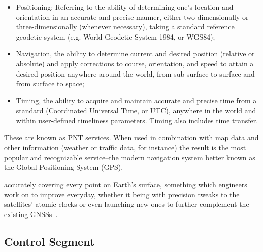 \begin{itemize}
    \item Positioning: Referring to the ability of determining one's location and orientation in an accurate and precise manner, either two-dimensionally or three-dimensionally (whenever necessary), taking a standard reference geodetic system (e.g. World Geodetic System 1984, or WGS84);
    \item Navigation, the ability to determine current and desired position (relative or absolute) and apply corrections to course, orientation, and speed to attain a desired position anywhere around the world, from sub-surface to surface and from surface to space;
    \item Timing, the ability to acquire and maintain accurate and precise time from a standard (Coordinated Universal Time, or UTC), anywhere in the world and within user-defined timeliness parameters. Timing also includes time transfer.
\end{itemize}
These are known as PNT services.
When used in combination with map data and other information (weather or traffic data, for instance) the result is the most popular and recognizable service--the modern navigation system better known as the Global Positioning System (GPS).

accurately covering every point on Earth's surface, something which engineers work on to improve everyday, whether it being with precision tweaks to the satellites' atomic clocks or even launching new ones to further complement the existing GNSSs~\cite{euspa_news_2022}.


\subsection{Control Segment}\label{sec:II_gnss_control_seg}

